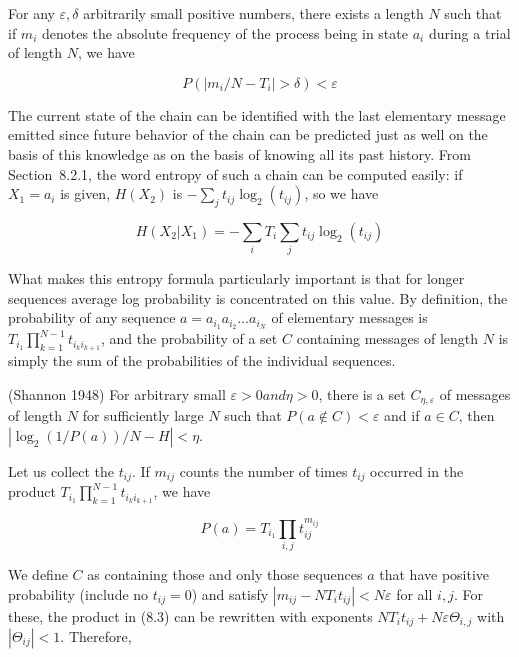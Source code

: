 \smallskip{} \cite{Markov:1912} For any
$\varepsilon, \delta$ arbitrarily small positive numbers, there exists a
length $N$ such that if $m_i$ denotes the absolute frequency of the process
being in state $a_i$ during a trial of length $N$, we have

\begin{equation}
P(|m_i/N-T_i| >\delta)<\varepsilon
\end{equation}

\noindent
The current state of the chain can be identified with the last elementary
message emitted since future behavior of the chain can be predicted just as
well on the basis of this knowledge as on the basis of knowing all its past
history.  From Section~8.2.1, the word entropy of such a chain can be computed
easily: if $X_1=a_i$ is given, $H(X_2)$ is $-\sum_j t_{ij}\log_2(t_{ij})$, so
we have

\begin{equation}
H(X_2|X_1) = -\sum_i T_i \sum_j t_{ij}\log_2(t_{ij})
\end{equation}

\noindent 
What makes this entropy formula particularly important is that for longer
sequences average log probability is concentrated on this value. By
definition, the probability of any sequence $a= a_{i_1} a_{i_2} \ldots
a_{i_N}$ of elementary messages is $T_{i_1}\prod_{k=1}^{N-1} t_{i_ki_{k+1}}$,
and the probability of a set $C$ containing messages of length $N$ is simply
the sum of the probabilities of the individual sequences.

\smallskip{} (Shannon 1948) For arbitrary small
$\varepsilon > 0 and \eta > 0$, there is a set $C_{\eta, \varepsilon}$ of
messages of length $N$ for sufficiently large $N$ such that $P(a \not\in C) <
\varepsilon$ and if $a\in C$, then $|\log_2(1/P(a))/N-H| < \eta$.

\smallskip{} Let us collect the $t_{ij}$. If $m_{ij}$
counts the number of times $t_{ij}$ occurred in the product
$T_{i_1}\prod_{k=1}^{N-1} t_{i_ki_{k+1}}$, we have

\begin{equation}
P(a)=T_{i_1}\prod_{i,j} t_{ij}^{m_{ij}}
\end{equation}

\noindent We define $C$ as containing those and only those sequences $a$ that
have positive probability (include no $t_{ij}=0$) and satisfy $|m_{ij}
-NT_it_{ij}| < N\varepsilon$ for all $i,j$. For these, the product in (8.3)
can be rewritten with exponents $NT_it_{ij}+N\varepsilon\Theta_{i,j}$ with
$|\Theta_{ij}|<1$. Therefore,

